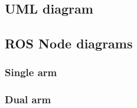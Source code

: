 \subsection*{U\+ML diagram}

 

\subsection*{R\+OS Node diagrams}

\subsubsection*{Single arm}

 

\subsubsection*{Dual arm}

  